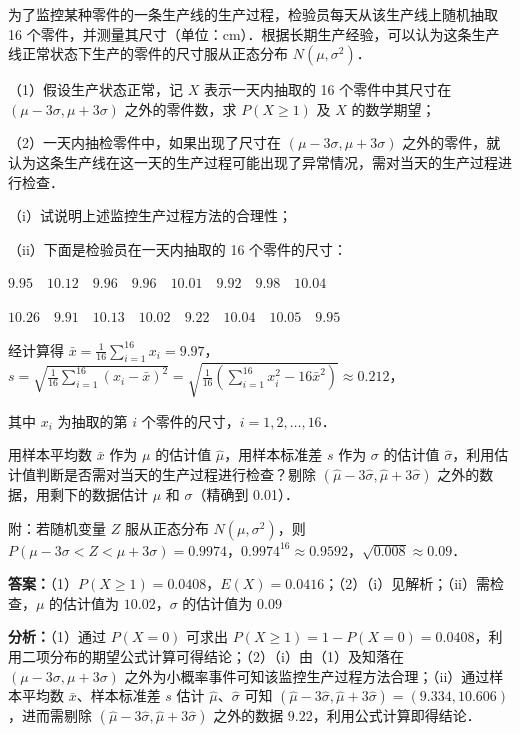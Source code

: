 \begin{question}[points=12]
为了监控某种零件的一条生产线的生产过程，检验员每天从该生产线上随机抽取 16 个零件，并测量其尺寸（单位：cm）．根据长期生产经验，可以认为这条生产线正常状态下生产的零件的尺寸服从正态分布 $N(\mu,\sigma^2)$．

（1）假设生产状态正常，记 $X$ 表示一天内抽取的 16 个零件中其尺寸在 $(\mu-3\sigma,\mu+3\sigma)$ 之外的零件数，求 $P(X\geq 1)$ 及 $X$ 的数学期望；

（2）一天内抽检零件中，如果出现了尺寸在 $(\mu-3\sigma,\mu+3\sigma)$ 之外的零件，就认为这条生产线在这一天的生产过程可能出现了异常情况，需对当天的生产过程进行检查．

（$\text{i}$）试说明上述监控生产过程方法的合理性；

（$\text{ii}$）下面是检验员在一天内抽取的 16 个零件的尺寸：



$9.95\quad 10.12\quad 9.96\quad 9.96\quad 10.01\quad 9.92\quad 9.98\quad 10.04$



$10.26\quad 9.91\quad 10.13\quad 10.02\quad 9.22\quad 10.04\quad 10.05\quad 9.95$



经计算得 $\bar{x}=\frac{1}{16}\sum_{i=1}^{16}x_i=9.97$，$s=\sqrt{\frac{1}{16}\sum_{i=1}^{16}(x_i-\bar{x})^2}=\sqrt{\frac{1}{16}(\sum_{i=1}^{16}x_i^2-16\bar{x}^2)}\approx0.212$，

其中 $x_i$ 为抽取的第 $i$ 个零件的尺寸，$i=1,2,\ldots,16$．



用样本平均数 $\bar{x}$ 作为 $\mu$ 的估计值 $\hat{\mu}$，用样本标准差 $s$ 作为 $\sigma$ 的估计值 $\hat{\sigma}$，利用估计值判断是否需对当天的生产过程进行检查？剔除 $(\hat{\mu}-3\hat{\sigma},\hat{\mu}+3\hat{\sigma})$ 之外的数据，用剩下的数据估计 $\mu$ 和 $\sigma$（精确到 0.01）．

附：若随机变量 $Z$ 服从正态分布 $N(\mu,\sigma^2)$，则 $P(\mu-3\sigma<Z<\mu+3\sigma)=0.9974$，$0.9974^{16}\approx0.9592$，$\sqrt{0.008}\approx0.09$．
\begin{solution}
\textbf{答案：}（1）$P(X\geq1)=0.0408$，$E(X)=0.0416$；（2）（$\text{i}$）见解析；（$\text{ii}$）需检查，$\mu$ 的估计值为 $10.02$，$\sigma$ 的估计值为 $0.09$

\textbf{分析：}（1）通过 $P(X=0)$ 可求出 $P(X\geq1)=1-P(X=0)=0.0408$，利用二项分布的期望公式计算可得结论；（2）（$\text{i}$）由（1）及知落在 $(\mu-3\sigma,\mu+3\sigma)$ 之外为小概率事件可知该监控生产过程方法合理；（$\text{ii}$）通过样本平均数 $\bar{x}$、样本标准差 $s$ 估计 $\hat{\mu}$、$\hat{\sigma}$ 可知 $(\hat{\mu}-3\hat{\sigma},\hat{\mu}+3\hat{\sigma})=(9.334,10.606)$，进而需剔除 $(\hat{\mu}-3\hat{\sigma},\hat{\mu}+3\hat{\sigma})$ 之外的数据 $9.22$，利用公式计算即得结论．


\end{solution}
\end{question}
